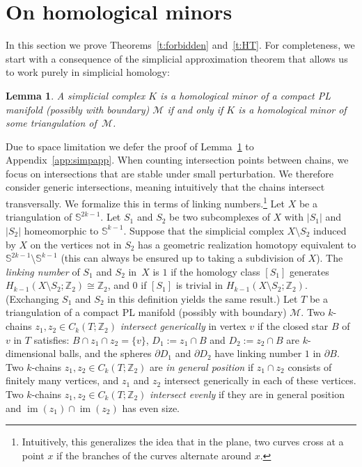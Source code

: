 \documentclass[11pt]{article}
\newcommand{\Z}{\mathbb{Z}}
\newcommand{\s}{\mathbb{S}}
\newcommand{\M}{\mathcal{M}}
\DeclareMathOperator{\im}{im}
\newcommand{\defn}[1]{\emph{\color{violet}#1}}
\newtheorem{lemma}{Lemma}[section]
\begin{document}
\section{On homological minors}\label{s:toolbox}\label{s:back}
%
In this section we prove Theorems~\ref{t:forbidden} and~\ref{t:HT}. For completeness, we start with a consequence of the simplicial approximation theorem that allows us to work purely in simplicial homology:
%
\begin{lemma}\label{l:going-generic-simplicial}
  A simplicial complex $K$ is a homological minor of a compact PL manifold (possibly with boundary) $\M$ if and only if $K$ is a homological minor of some triangulation of~$\M$.
\end{lemma}
%
\noindent
Due to space limitation we defer the proof of Lemma~\ref{l:going-generic-simplicial} to Appendix~\ref{app:simpapp}.
%
\medskip
%
When counting intersection points between chains, we focus on intersections that are stable under small perturbation. We therefore consider generic intersections, meaning intuitively that the chains intersect transversally. We formalize this in terms of linking numbers.\footnote{Intuitively, this generalizes the idea that in the plane, two curves cross at a point $x$ if the branches of the curves alternate around $x$.}
%
\medskip
%
Let $X$ be a triangulation of $\s^{2k-1}$. Let $S_1$ and $S_2$ be two subcomplexes of $X$ with $|S_1|$ and $|S_2|$ homeomorphic to $\s^{k-1}$. Suppose that the simplicial complex $X \setminus S_2$ induced by $X$ on the vertices not in $S_2$ has a geometric realization homotopy equivalent to $\s^{2k-1}\setminus \s^{k-1}$ (this can always be ensured up to taking a subdivision of $X$). The \defn{linking number} of $S_1$ and $S_2$ in~$X$ is $1$ if the homology class $[S_1]$ generates $H_{k-1}(X\setminus S_2;\Z_2)\cong\Z_2$, and $0$ if $[S_1]$ is trivial in $H_{k-1}(X\setminus S_2;\Z_2)$. (Exchanging $S_1$ and $S_2$ in this definition yields the same result.)
%
\medskip
%
Let $T$ be a triangulation of a compact PL manifold (possibly with boundary) $\M$. Two $k$-chains $z_1,z_2\in C_k(T;\Z_2)$ \defn{intersect generically} in vertex $v$ if the closed star $B$ of $v$ in $T$ satisfies: $B \cap z_1 \cap z_2 = \{v\}$, $D_1:= z_1 \cap B$ and $D_2:= z_2 \cap B$ are $k$-dimensional balls, and the spheres $\partial D_1$ and $\partial D_2$ have linking number $1$ in $\partial B$. Two $k$-chains $z_1,z_2\in C_k(T;\Z_2)$ are \defn{in general position} if $z_1 \cap z_2$ consists of finitely many vertices, and $z_1$ and $z_2$ intersect generically in each of these vertices. Two $k$-chains $z_1,z_2\in C_k(T;\Z_2)$ \defn{intersect evenly} if they are in general position and $\im(z_1)\cap \im(z_2)$ has even size.
\end{document}
